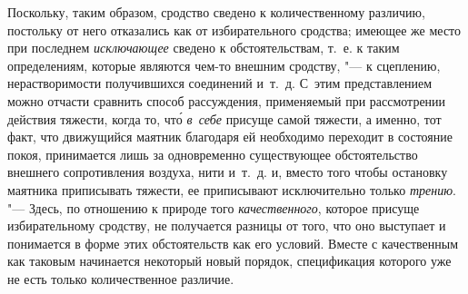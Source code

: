 Поскольку, таким образом, сродство сведено к количественному различию,
постольку от него отказались как от избирательного сродства; имеющее же место
при последнем {\em исключающее} сведено к обстоятельствам, т.~е. к таким
определениям, которые являются чем-то внешним сродству, "--- к сцеплению,
нерастворимости получившихся соединений и~т.~д. С~этим представлением можно
отчасти сравнить способ рассуждения, применяемый при рассмотрении действия
тяжести, когда то, чт\'{о} {\em в~себе} присуще самой тяжести, а именно, тот
факт, что движущийся маятник благодаря ей необходимо переходит в состояние
покоя, принимается лишь за одновременно существующее обстоятельство внешнего
сопротивления воздуха, нити и~т.~д. и, вместо того чтобы остановку маятника
приписывать тяжести, ее приписывают исключительно только
{\em трению}. "--- Здесь, по отношению к природе того
{\em качественного}, которое присуще избирательному сродству, не получается
разницы от того, что оно выступает и понимается в форме этих обстоятельств как
его условий. Вместе с качественным как таковым начинается некоторый новый
порядок, спецификация которого уже не есть только количественное различие.

